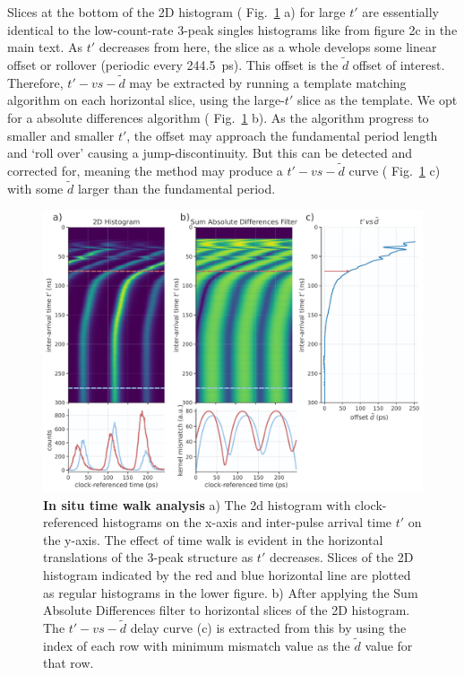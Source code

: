 \documentclass[11pt]{caltech_thesis} %
\begin{document}
Slices at the bottom of the 2D histogram ( Fig.~\ref{fig:time_walk} a) for large $t'$ are essentially identical to the low-count-rate 3-peak singles histograms like from figure 2c in the main text. As $t'$ decreases from here, the slice as a whole develops some linear offset or rollover (periodic every 244.5~ps). This offset is the $\tilde{d}$ offset of interest. Therefore, $t'-vs-\tilde{d}$ may be extracted by running a template matching algorithm on each horizontal slice, using the large-$t'$ slice as the template. We opt for a absolute differences algorithm ( Fig.~\ref{fig:time_walk} b). As the algorithm progress to smaller and smaller $t'$, the offset may approach the fundamental period length and `roll over' causing a jump-discontinuity. But this can be detected and corrected for, meaning the method may produce a $t'-vs-\tilde{d}$ curve ( Fig.~\ref{fig:time_walk} c) with some $\tilde{d}$ larger than the fundamental period.

\hypertarget{fig:time_walk}{%
\begin{figure}
\centering
\includegraphics[width=1\textwidth,height=\textheight]{./chapter_05/figs/time_walk_analysis_light.pdf}
\caption[{In situ time walk analysis}]{\textbf{In situ time walk analysis} a) The 2d histogram with clock-referenced histograms on the x-axis and inter-pulse arrival time $t'$ on the y-axis. The effect of time walk is evident in the horizontal translations of the 3-peak structure as $t'$ decreases. Slices of the 2D histogram indicated by the red and blue horizontal line are plotted as regular histograms in the lower figure. b) After applying the Sum Absolute Differences filter to horizontal slices of the 2D histogram. The $t'-vs-\tilde{d}$ delay curve (c) is extracted from this by using the index of each row with minimum mismatch value as the $\tilde{d}$ value for that row.}
\label{fig:time_walk}
\end{figure}
}
\end{document}
